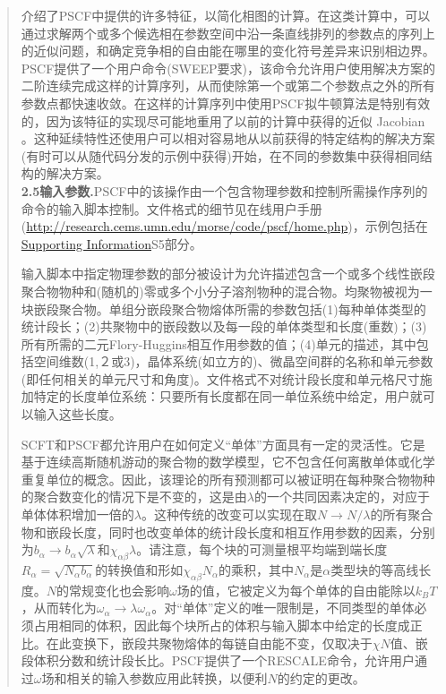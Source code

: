\documentclass{article}
\begin{document}
\begin{CJK}{UTF8}{gkai}
\begin{quotation}
介绍了PSCF中提供的许多特征，以简化相图的计算。在这类计算中，可以通过求解两个或多个候选相在参数空间中沿一条直线排列的参数点的序列上的近似问题，和确定竞争相的自由能在哪里的变化符号差异来识别相边界。PSCF提供了一个用户命令(SWEEP要求)，该命令允许用户使用解决方案的二阶连续完成这样的计算序列，从而使除第一个或第二个参数点之外的所有参数点都快速收敛。在这样的计算序列中使用PSCF拟牛顿算法是特别有效的，因为该特征的实现尽可能地重用了以前的计算中获得的近似 Jacobian 。这种延续特性还使用户可以相对容易地从以前获得的特定结构的解决方案(有时可以从随代码分发的示例中获得)开始，在不同的参数集中获得相同结构的解决方案。\\
\textbf{2.5输入参数.}PSCF中的该操作由一个包含物理参数和控制所需操作序列的命令的输入脚本控制。文件格式的细节见在线用户手册(\url{http://research.cems.umn.edu/morse/code/pscf/home.php})，示例包括在\href{http://pubs.acs.org/doi/suppl/10.1021/acs.macromol.6b00107/suppl_file/ma6b00107_si_001.pdf}{Supporting Information}S5部分。

输入脚本中指定物理参数的部分被设计为允许描述包含一个或多个线性嵌段聚合物物种和(随机的)零或多个小分子溶剂物种的混合物。均聚物被视为一块嵌段聚合物。单组分嵌段聚合物熔体所需的参数包括(1)每种单体类型的统计段长；(2)共聚物中的嵌段数以及每一段的单体类型和长度(重数)；(3)所有所需的二元Flory-Huggins相互作用参数的值；(4)单元的描述，其中包括空间维数(1,２或3)，晶体系统(如立方的)、微晶空间群的名称和单元参数(即任何相关的单元尺寸和角度)。文件格式不对统计段长度和单元格尺寸施加特定的长度单位系统：只要所有长度都在同一单位系统中给定，用户就可以输入这些长度。

SCFT和PSCF都允许用户在如何定义“单体”方面具有一定的灵活性。它是基于连续高斯随机游动的聚合物的数学模型，它不包含任何离散单体或化学重复单位的概念。因此，该理论的所有预测都可以被证明在每种聚合物物种的聚合数变化的情况下是不变的，这是由$\lambda$的一个共同因素决定的，对应于单体体积增加一倍的$\lambda$。这种传统的改变可以实现在取$N \rightarrow N/ \lambda$的所有聚合物和嵌段长度，同时也改变单体的统计段长度和相互作用参数的因素，分别为$b_{\alpha}\rightarrow b_{\alpha}\sqrt{\lambda}$和$\chi _{\alpha \beta} \lambda$。请注意，每个块的可测量根平均端到端长度$R_{\alpha}=\sqrt{N_{\alpha}b_{\alpha}}$的转换值和形如$\chi _{\alpha \beta} N_{\alpha}$的乘积，其中$N_{\alpha}$是$\alpha$类型块的等高线长度。$N$的常规变化也会影响$\omega$场的值，它被定义为每个单体的自由能除以$k_BT$，从而转化为$\omega _{\alpha} \rightarrow \lambda \omega _{\alpha}$。对“单体”定义的唯一限制是，不同类型的单体必须占用相同的体积，因此每个块所占的体积与输入脚本中给定的长度成正比。在此变换下，嵌段共聚物熔体的每链自由能不变，仅取决于$\chi N$值、嵌段体积分数和统计段长比。PSCF提供了一个RESCALE命令，允许用户通过$\omega$场和相关的输入参数应用此转换，以便利$N$的约定的更改。


\end{quotation}
\end{CJK}
\end{document}
